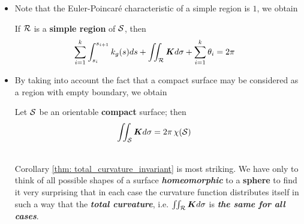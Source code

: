 \documentclass[11pt]{article}
\begin{document}
\begin{itemize}
\begin{proof}
By putting things together, we finally obtain
\begin{align*}
\sum_{i=1}^{n}\int_{C_{i}}k_{g}(s)ds + \iint_{\cR}\mb{K}d\sigma + \sum_{i=1}^{p}\theta_{i} &= 2\pi\,\paren{F - E + V}\\
&= 2\pi\,\chi(\cR)
\end{align*} \qed
\end{proof}

\item Note that the Euler-Poincar\'e characteristic of a simple region is $1$, we obtain
\begin{corollary}
If ${\mathcal R}$ is a \textbf{simple region} of ${\mathcal S}$, then
\begin{align*}
\sum_{i=1}^{k}\int_{s_{i}}^{s_{i+1}}k_{g}(s)ds + \iint_{{\mathcal R}}\boldsymbol{K}d\sigma + \sum_{i=1}^{k}\theta_{i} &= 2\pi
\end{align*}
\end{corollary}

\item By taking into account the fact that a compact surface may be considered as a region with empty boundary, we obtain
\begin{corollary}\label{thm: total_curvature_invariant}
Let ${\mathcal S}$ be an orientable \textbf{compact} surface; then
\begin{align*}
\iint_{{\mathcal S}}\boldsymbol{K}d\sigma &= 2\pi\,\chi({\mathcal S})
\end{align*}
\end{corollary}

\begin{remark}\citep{do1976differential}\\
Corollary \ref{thm: total_curvature_invariant} is most striking. We have only to think of all possible shapes of a surface \emph{\textbf{homeomorphic}} to a \textbf{sphere} to find it very surprising that in each case the curvature function distributes itself in such a way that the \emph{\textbf{total curvature}}, i.e. $\iint_{{\mathcal R}}\boldsymbol{K}d\sigma$ is \textbf{\emph{the same for all cases}}.
\end{remark}
\end{itemize}
\end{document}
